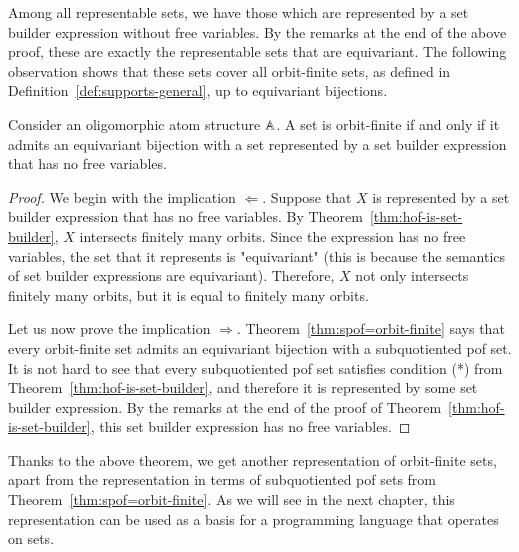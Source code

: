 Among all representable sets, we have those which are represented by a set builder expression without free variables. By the remarks at the end of the above proof, these are exactly the representable sets that are equivariant. The following observation shows that these sets cover all orbit-finite sets, as defined in Definition~\ref{def:supports-general},  up to equivariant bijections.


\begin{corollary}\label{cor:orbit-finite-is-set-builder}
		Consider an oligomorphic atom structure $\mathbb A$. A set is orbit-finite if and only if it admits an equivariant bijection with a set represented by a set builder expression that has no free variables.
\end{corollary}
\begin{proof}
	We begin with the implication  $\Leftarrow$. Suppose that  $X$ is represented by a set builder expression that has no free variables. By Theorem~\ref{thm:hof-is-set-builder},  $X$ intersects finitely many orbits. Since the expression has no free variables, the set that it represents is  "equivariant" (this is because the semantics of set builder expressions are equivariant). Therefore, $X$ not only intersects finitely many orbits, but it is equal to finitely many orbits.
	
	Let us now prove the implication $\Rightarrow$. Theorem~\ref{thm:spof=orbit-finite} says that every orbit-finite set admits an equivariant bijection with a subquotiented pof set. It is not hard to see that every subquotiented pof set satisfies condition (*) from  Theorem~\ref{thm:hof-is-set-builder},  and therefore it is represented by some set builder expression. By the remarks at the end of the proof of Theorem~\ref{thm:hof-is-set-builder},  this set builder expression has no free variables.  
\end{proof}

Thanks to the above theorem, we get another representation of orbit-finite sets, apart from the representation in terms of subquotiented pof sets from Theorem~\ref{thm:spof=orbit-finite}. As we will see in the next chapter, this representation can be used as a basis for a programming language that operates on sets. 



